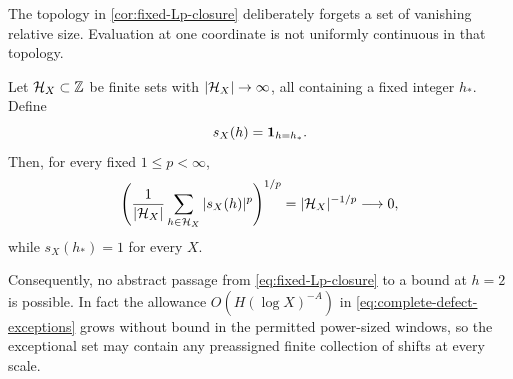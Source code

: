 The topology in \cref{cor:fixed-Lp-closure} deliberately forgets a set of
vanishing relative size.  Evaluation at one coordinate is not uniformly
continuous in that topology.

\begin{proposition}
\label{prop:fixed-coordinate-spike}
Let $\mathcal H_X\subset\mathbb Z$ be finite sets with $|\mathcal H_X|\to\infty$, all containing
a fixed integer $h_\ast$.  Define
\begin{equation}\label{eq:spike-sequence}
 s_X(h)=\mathbf 1_{h=h_\ast}.
\end{equation}
Then, for every fixed $1\le p<\infty$,
\begin{equation}\label{eq:spike-Lp-vanishing}
 \left(\frac1{|\mathcal H_X|}\sum_{h\in\mathcal H_X}|s_X(h)|^p\right)^{1/p}
 =|\mathcal H_X|^{-1/p}\longrightarrow0,
\end{equation}
while $s_X(h_\ast)=1$ for every $X$.
\end{proposition}

Consequently, no abstract passage from \eqref{eq:fixed-Lp-closure} to a
bound at $h=2$ is possible.  In fact the allowance
$O(H(\log X)^{-A})$ in \eqref{eq:complete-defect-exceptions} grows without
bound in the permitted power-sized windows, so the exceptional set may
contain any preassigned finite collection of shifts at every scale.
